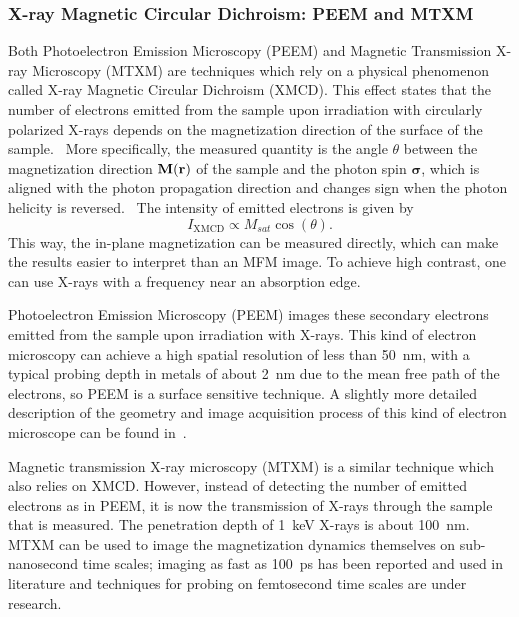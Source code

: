 \documentclass[11pt,a4paper,english]{article}
\renewcommand{\vec}[1]{\boldsymbol{#1}}
\begin{document}
\subsubsection{X-ray Magnetic Circular Dichroism: PEEM and MTXM}
Both Photoelectron Emission Microscopy (PEEM) and Magnetic Transmission X-ray Microscopy (MTXM) are techniques which rely on a physical phenomenon called X-ray Magnetic Circular Dichroism (XMCD). This effect states that the number of electrons emitted from the sample upon irradiation with circularly polarized X-rays depends on the magnetization direction of the surface of the sample.~\cite{NML_Carlton} More specifically, the measured quantity is the angle $\theta$ between the magnetization direction $\vb{M(\vb{r})}$ of the sample and the photon spin $\vec{\sigma}$, which is aligned with the photon propagation direction and changes sign when the photon helicity is reversed.~\cite{PEEM} The intensity of emitted electrons is given by
\begin{equation}
    I_{\mathrm{XMCD}} \propto M_{sat} \cos(\theta) \mathrm{.}
    \label{eq:XMCD}
\end{equation} 
This way, the in-plane magnetization can be measured directly, which can make the results easier to interpret than an MFM image. To achieve high contrast, one can use X-rays with a frequency near an absorption edge.~\cite{SubnanosecondPropagation_AnisotropyChains} \par

Photoelectron Emission Microscopy (PEEM) images these secondary electrons emitted from the sample upon irradiation with X-rays. This kind of electron microscopy can achieve a high spatial resolution of less than \SI{50}{\nano\metre}, with a typical probing depth in metals of about \SI{2}{\nano\metre} due to the mean free path of the electrons, so PEEM is a surface sensitive technique. A slightly more detailed description of the geometry and image acquisition process of this kind of electron microscope can be found in~\cite{PEEM}. \par 

Magnetic transmission X-ray microscopy (MTXM) is a similar technique which also relies on XMCD. However, instead of detecting the number of emitted electrons as in PEEM, it is now the transmission of X-rays through the sample that is measured. The penetration depth of \SI{1}{\kilo\electronvolt} X-rays is about \SI{100}{\nano\metre}.~\cite{Imaging_MTXM} MTXM can be used to image the magnetization dynamics themselves on sub-nanosecond time scales; imaging as fast as \SI{100}{\pico\second} has been reported and used in literature and techniques for probing on femtosecond time scales are under research.~\cite{SubnanosecondPropagation_AnisotropyChains, Imaging_MTXM} \par
\end{document}
